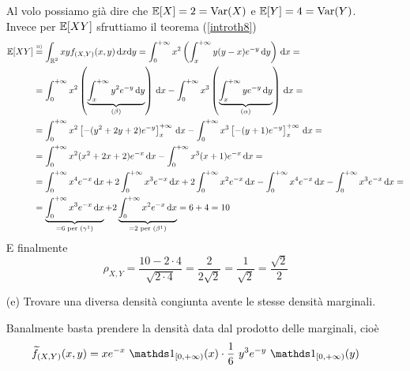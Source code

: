 \begin{enumerate}
Al volo possiamo già dire che $\mathbb{E}[X]=2=\operatorname{Var}(X)$ e $\mathbb{E}[Y]=4=\operatorname{Var}(Y)$. Invece per $\mathbb{E}[XY]$ sfruttiamo il teorema (\ref{introth8})
\begin{gather*}
\begin{aligned}
\mathbb{E}[XY]&\overset{\underset{\text{ii)}}{}}{=}\int_{\mathbb{R}^2}xyf_{(X,Y)}(x,y) \, \mathrm{d} x \mathrm{d} y=\int_0^{+\infty}x^2\left(\int_x^{+\infty}y(y-x)e^{-y}\, \mathrm{d} y   \right)\, \mathrm{d} x=\\
&=\int_0^{+\infty}x^2\left(\underbrace{\int_x^{+\infty}y^2e^{-y}\, \mathrm{d} y}_{(\beta)}   \right)\, \mathrm{d} x-\int_0^{+\infty}x^3\left(\underbrace{\int_x^{+\infty}ye^{-y}\, \mathrm{d} y}_{(\alpha)}   \right)\, \mathrm{d} x=\\
&=\int_0^{+\infty}x^2\left[-(y^2+2y+2)e^{-y} \right]_x^{+\infty}\, \mathrm{d} x-\int_0^{+\infty}x^3\left[-(y+1)e^{-y} \right]_x^{+\infty}\, \mathrm{d} x=\\
&=\int_0^{+\infty}x^2(x^2+2x+2)e^{-x}\, \mathrm{d} x-\int_0^{+\infty}x^3(x+1)e^{-x}\, \mathrm{d} x=\\
&=\int_0^{+\infty}x^4e^{-x}   \, \mathrm{d} x+2\int_0^{+\infty}x^3e^{-x}   \, \mathrm{d} x+2\int_0^{+\infty}x^2e^{-x}   \, \mathrm{d} x-\int_0^{+\infty}x^4e^{-x}   \, \mathrm{d} x-\int_0^{+\infty}  x^3e^{-x} \, \mathrm{d} x=\\
&=\underbrace{\int_0^{+\infty}x^3e^{-x}   \, \mathrm{d} x}_{=6\text{ per }(\gamma^1)}+2\underbrace{\int_0^{+\infty}x^2e^{-x}   \, \mathrm{d} x}_{=2\text{ per }(\beta^1)}=6+4=10
\end{aligned}
\end{gather*}
E finalmente
\begin{equation*}
\rho_{X,Y}=\frac{10-2\cdot 4}{\sqrt{2\cdot 4}}=\frac{2}{2\sqrt{2}}=\frac{1}{\sqrt{2}}=\frac{\sqrt{2}}{2}
\end{equation*}
\item [(e)] Trovare una diversa densità congiunta avente le stesse densità marginali.

Banalmente basta prendere la densità data dal prodotto delle marginali, cioè
\begin{equation*}
\widetilde{f}_{(X,Y)}(x,y)=xe^{-x}\ \Ind_{[0,+\infty)}(x)\cdot \frac{1}{6}\ y^3e^{-y}\ \Ind_{[0,+\infty)}(y)
\end{equation*}
\end{enumerate}

